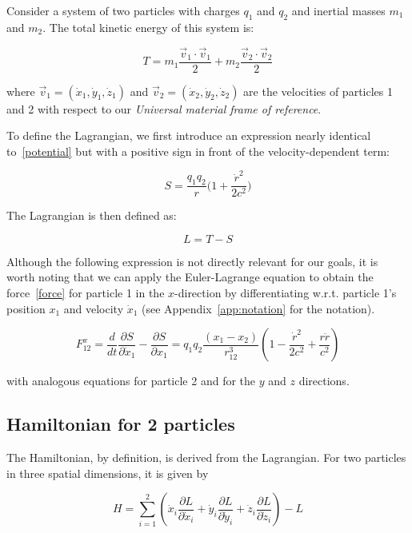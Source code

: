 \documentclass[12pt,a4paper]{article}
\theoremstyle{definition}
\theoremstyle{remark}
\newcommand{\qq}{q_1 q_2}
\newcommand{\rdot}{\dot{r}}
\begin{document}
Consider a system of two particles with charges $q_1$ and $q_2$ and inertial masses $m_1$ and $m_2$. The total kinetic energy of this system is:

\begin{equation}\label{ke}
    T = m_1 \frac{\vec{v}_1 \cdot \vec{v}_1}{2} + m_2 \frac{\vec{v}_2 \cdot \vec{v}_2}{2}
\end{equation}

where $\vec{v}_1 = (\dot{x}_1, \dot{y}_1, \dot{z}_1)$ and $\vec{v}_2 = (\dot{x}_2, \dot{y}_2, \dot{z}_2)$ are the velocities of particles 1 and 2 with respect to our \textit{Universal material frame of reference}.

To define the Lagrangian, we first introduce an expression nearly identical to~\eqref{potential} but with a positive sign in front of the velocity-dependent term:

\begin{equation}
    S = \frac{\qq}{r}\bigg(1 + \frac{\rdot^2}{2c^2}\bigg)
\end{equation}

The Lagrangian is then defined as:

\begin{equation}
    \boxed{L = T - S}
\end{equation}

Although the following expression is not directly relevant for our goals, it is worth noting that we can apply the Euler-Lagrange equation to obtain the force~\eqref{force} for particle 1 in the $x$-direction by differentiating w.r.t. particle 1's position $x_1$ and velocity $\dot{x}_1$ (see Appendix~\ref{app:notation} for the notation).

\begin{equation}\label{euler_lagrange}
    F_{12}^x = \frac{d}{dt}\frac{\partial S}{\partial \dot{x}_1} - \frac{\partial S}{\partial x_1} = \qq \frac{(x_1 - x_2)}{r_{12}^3} \left(1 - \frac{\dot{r}^2}{2c^2} + \frac{r\ddot{r}}{c^2}\right)
\end{equation}

with analogous equations for particle 2 and for the $y$ and $z$ directions.

\subsection{Hamiltonian for 2 particles}
The Hamiltonian, by definition, is derived from the Lagrangian. For two particles in three spatial dimensions, it is given by

\begin{equation}\label{H_def}
    H = \sum_{i=1}^{2} \left(\dot{x}_i \frac{\partial L}{\partial \dot{x}_i} + \dot{y}_i \frac{\partial L}{\partial \dot{y}_i} + \dot{z}_i \frac{\partial L}{\partial \dot{z}_i}\right) - L
\end{equation}
\end{document}
